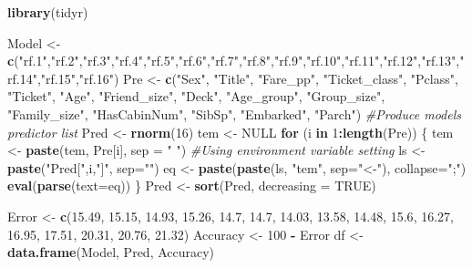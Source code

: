 \documentclass[
]{book}
\newenvironment{Shaded}{\begin{snugshade}}{\end{snugshade}}
\newcommand{\CommentTok}[1]{\textcolor[rgb]{0.56,0.35,0.01}{\textit{#1}}}
\newcommand{\ControlFlowTok}[1]{\textcolor[rgb]{0.13,0.29,0.53}{\textbf{#1}}}
\newcommand{\DataTypeTok}[1]{\textcolor[rgb]{0.13,0.29,0.53}{#1}}
\newcommand{\DecValTok}[1]{\textcolor[rgb]{0.00,0.00,0.81}{#1}}
\newcommand{\FloatTok}[1]{\textcolor[rgb]{0.00,0.00,0.81}{#1}}
\newcommand{\KeywordTok}[1]{\textcolor[rgb]{0.13,0.29,0.53}{\textbf{#1}}}
\newcommand{\NormalTok}[1]{#1}
\newcommand{\OperatorTok}[1]{\textcolor[rgb]{0.81,0.36,0.00}{\textbf{#1}}}
\newcommand{\OtherTok}[1]{\textcolor[rgb]{0.56,0.35,0.01}{#1}}
\newcommand{\StringTok}[1]{\textcolor[rgb]{0.31,0.60,0.02}{#1}}
\begin{document}
\begin{Shaded}
\begin{Highlighting}[]
\KeywordTok{library}\NormalTok{(tidyr)}

\NormalTok{Model <-}\StringTok{ }\KeywordTok{c}\NormalTok{(}\StringTok{"rf.1"}\NormalTok{,}\StringTok{"rf.2"}\NormalTok{,}\StringTok{"rf.3"}\NormalTok{,}\StringTok{"rf.4"}\NormalTok{,}\StringTok{"rf.5"}\NormalTok{,}\StringTok{"rf.6"}\NormalTok{,}\StringTok{"rf.7"}\NormalTok{,}\StringTok{"rf.8"}\NormalTok{,}\StringTok{"rf.9"}\NormalTok{,}\StringTok{"rf.10"}\NormalTok{,}\StringTok{"rf.11"}\NormalTok{,}\StringTok{"rf.12"}\NormalTok{,}\StringTok{"rf.13"}\NormalTok{,}\StringTok{"rf.14"}\NormalTok{,}\StringTok{"rf.15"}\NormalTok{,}\StringTok{"rf.16"}\NormalTok{)}
\NormalTok{Pre <-}\StringTok{ }\KeywordTok{c}\NormalTok{(}\StringTok{"Sex"}\NormalTok{, }\StringTok{"Title"}\NormalTok{, }\StringTok{"Fare_pp"}\NormalTok{, }\StringTok{"Ticket_class"}\NormalTok{, }\StringTok{"Pclass"}\NormalTok{, }\StringTok{"Ticket"}\NormalTok{, }\StringTok{"Age"}\NormalTok{, }\StringTok{"Friend_size"}\NormalTok{, }\StringTok{"Deck"}\NormalTok{, }\StringTok{"Age_group"}\NormalTok{, }\StringTok{"Group_size"}\NormalTok{, }\StringTok{"Family_size"}\NormalTok{, }\StringTok{"HasCabinNum"}\NormalTok{, }\StringTok{"SibSp"}\NormalTok{, }\StringTok{"Embarked"}\NormalTok{, }\StringTok{"Parch"}\NormalTok{)}
\CommentTok{#Produce models predictor list}
\NormalTok{Pred <-}\StringTok{ }\KeywordTok{rnorm}\NormalTok{(}\DecValTok{16}\NormalTok{)}
\NormalTok{tem <-}\StringTok{ }\OtherTok{NULL}
\ControlFlowTok{for}\NormalTok{ (i }\ControlFlowTok{in} \DecValTok{1}\OperatorTok{:}\KeywordTok{length}\NormalTok{(Pre)) \{}
\NormalTok{  tem  <-}\StringTok{ }\KeywordTok{paste}\NormalTok{(tem, Pre[i], }\DataTypeTok{sep =} \StringTok{" "}\NormalTok{)}
\CommentTok{#Using environment variable setting    }
\NormalTok{  ls  <-}\StringTok{ }\KeywordTok{paste}\NormalTok{(}\StringTok{"Pred["}\NormalTok{,i,}\StringTok{"]"}\NormalTok{, }\DataTypeTok{sep=}\StringTok{""}\NormalTok{)}
\NormalTok{  eq  <-}\StringTok{ }\KeywordTok{paste}\NormalTok{(}\KeywordTok{paste}\NormalTok{(ls, }\StringTok{"tem"}\NormalTok{, }\DataTypeTok{sep=}\StringTok{"<-"}\NormalTok{), }\DataTypeTok{collapse=}\StringTok{";"}\NormalTok{)  }
  \KeywordTok{eval}\NormalTok{(}\KeywordTok{parse}\NormalTok{(}\DataTypeTok{text=}\NormalTok{eq)) }
\NormalTok{  \}}
\NormalTok{Pred <-}\StringTok{ }\KeywordTok{sort}\NormalTok{(Pred, }\DataTypeTok{decreasing =} \OtherTok{TRUE}\NormalTok{)}

\NormalTok{Error <-}\StringTok{ }\KeywordTok{c}\NormalTok{(}\FloatTok{15.49}\NormalTok{, }\FloatTok{15.15}\NormalTok{, }\FloatTok{14.93}\NormalTok{, }\FloatTok{15.26}\NormalTok{, }\FloatTok{14.7}\NormalTok{, }\FloatTok{14.7}\NormalTok{, }\FloatTok{14.03}\NormalTok{, }\FloatTok{13.58}\NormalTok{, }\FloatTok{14.48}\NormalTok{, }\FloatTok{15.6}\NormalTok{, }\FloatTok{16.27}\NormalTok{, }\FloatTok{16.95}\NormalTok{, }\FloatTok{17.51}\NormalTok{, }\FloatTok{20.31}\NormalTok{, }\FloatTok{20.76}\NormalTok{, }\FloatTok{21.32}\NormalTok{)}
\NormalTok{Accuracy <-}\StringTok{ }\DecValTok{100} \OperatorTok{-}\StringTok{ }\NormalTok{Error}
\NormalTok{df <-}\StringTok{ }\KeywordTok{data.frame}\NormalTok{(Model, Pred, Accuracy)}


\end{Highlighting}
\end{Shaded}
\end{document}
